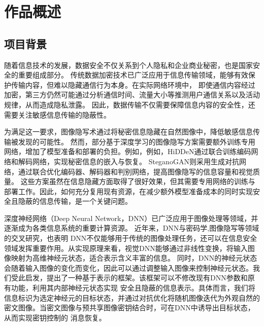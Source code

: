 \section{作品概述}
\subsection{项目背景}
随着信息技术的发展，数据安全不仅关系到个人隐私和企业商业秘密，也是国家安全的重要组成部分。
传统数据加密技术已广泛应用于信息传输领域，能够有效保护传输内容，但难以隐藏通信行为本身。在实际网络环境中，
即使通信内容经过加密，第三方仍然可能通过分析通信时间、流量大小等推测用户通信关系以及活动规律，从而造成隐私泄露。
因此，数据传输不仅需要保障信息内容的安全性，还需要关注敏感信息传输的隐蔽性。

为满足这一要求，图像隐写术通过将秘密信息隐藏在自然图像中，降低敏感信息传输被发现的可能性\supercite{1-wang-moulin-2008,2-yang-et-al-2024}。
然而，部分基于深度学习的图像隐写方案需要额外训练专用网络，增加了模型准备和部署的负担。例如，例如，HiDDeN通过联合训练编码网络和解码网络，实现秘密信息的嵌入与恢复\supercite{3-zhu-et-al-2018}。
SteganoGAN则采用生成对抗网络，通过联合优化编码器、解码器和判别网络，提高图像隐写的信息容量和视觉质量\supercite{4-zhang-et-al-2019-steganogan}。
这些方案虽然在信息隐藏方面取得了很好效果，但其需要专用网络的训练与部署工作。因此，如何充分复用现有资源，在减少额外模型准备成本的同时实现安全且隐蔽的信息传输，是一个关键问题。

深度神经网络（Deep Neural Network，DNN）已广泛应用于图像处理等领域，并逐渐成为各类信息系统的重要计算资源\supercite{5-lecun-et-al-2015}。
近年来，DNN与密码学\supercite{6-abadi-andersen-2016,7-gerault-et-al-2026},图像隐写\supercite{8-luo-et-al-2023}等领域的交叉研究，也表明
DNN不仅能够用于传统的图像处理任务，还可以在信息安全领域发挥重要作用。从实现原理来看，视觉DNN能够通过非线性变换，将输入图像映射为高维神经元状态，适合表示含义丰富的信息\supercite{9-bengio-et-al-2013}。
同时，DNN的神经元状态会随着输入图像的变化而变化，因此可以通过调整输入图像来控制神经元状态。我们受此启发，提出了一种基于表示的框架。该框架可以不修改现有DNN参数和原有功能，利用其内部神经元状态实现
安全且隐蔽的信息表示。具体而言，我们将信息标识为选定神经元的目标状态，并通过对抗优化将随机图像迭代为外观自然的密文图像。当密文图像与预共享图像密钥结合时，可在DNN中诱导出目标状态，从而实现密钥控制的
消息恢复。

